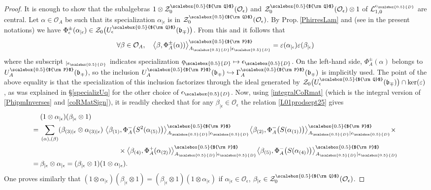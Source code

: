 \documentclass[11pt]{amsart}
\newcommand{\e}{\epsilon}
\newcommand{\Ll}{\mathcal{L}}
\newcommand{\Oo}{\mathcal{O}}
\newcommand{\qD}{q_{\scalebox{0.5}{D}}}
\newcommand{\eD}{\epsilon_{\scalebox{0.5}{D}}}
\newcommand{\Q}{{\scalebox{0.5}{${\rm Q}$}}}
\newcommand{\D}{{\scalebox{0.5}{D}}}
\newcommand{\Pup}{{\scalebox{0.5}{${\rm P}$}}}
\begin{document}
\begin{proof}
It is enough to show that the subalgebras $1\otimes \mathcal{Z}_0^\Q(\Oo_{\e})$ and $\mathcal{Z}_0^\Q(\Oo_{\e})\otimes 1$ of $\Ll_{1,0}^{\eD}$ are central. Let $\alpha\in \Oo_A$ be such that its specialization $\alpha_{\vert \e}$ is in $\mathcal{Z}_0^\Q(\Oo_{\e})$. By Prop.\,\ref{PhirresLam} and \cite[Prop. 6.5]{DC-L} (see \cite[Th.\,2.29(2)]{BR2} in the present notations) we have $\Phi_\e^\pm(\alpha_{\vert \e})\in \mathcal{Z}_0\bigl( U_{\e}^\Q(\mathfrak{b}_\mp) \bigr)$. From this and \cite[Lem.\,2.28]{BR2} it follows that
\[ \forall \beta\in \Oo_A,\quad \bigl\langle \beta,\Phi^\pm_A(\alpha))\bigr\rangle_{A_\D\vert \eD}^\Pup = \varepsilon(\alpha_{\vert \e})\varepsilon(\beta_{\vert \e}) \]
where the subscript $_{\vert\eD}$ indicates specialization $\qD \mapsto \eD$. On the left-hand side, $\Phi^{\pm}_A(\alpha)$ belongs to $U_A^\Pup(\mathfrak{b}_\mp)$, so the inclusion $U_A^\Pup(\mathfrak{b}_\mp) \hookrightarrow \Gamma_A^\Pup(\mathfrak{b}_\mp)$ is implicitly used. The point of the above equality is that the specialization of this inclusion factorizes through the ideal generated by $\mathcal{Z}_0\bigl( U_{\e}^\Q(\mathfrak{b}_\mp) \bigr) \cap \ker(\varepsilon)$, as was explained in \S\ref{specializUq} for the other choice of $\eD$. Now, using \eqref{integralCoRmat} (which is the integral version of \eqref{PhipmInverses} and \eqref{coRMatSign}), it is readily checked that for any $\beta_{\vert \e}\in \Oo_\e$ the relation \eqref{L01prodsept25} gives
\begin{align*}
&(1\otimes \alpha_{\vert \e}) (\beta_{\vert \e}\otimes 1) \\
=\:& \sum_{(\alpha),(\beta)} (\beta_{(3)|\e} \otimes \alpha_{(3)|\e})\ \bigl\langle \beta_{(1)},\Phi_A^-\bigl( S^{2}(\alpha_{(5)})\bigr)\bigr\rangle_{A_\D\vert \eD}^\Pup \bigl\langle \beta_{(2)}, \Phi_A^-\bigl( S(\alpha_{(1)}) \bigr) \bigr\rangle_{A_\D\vert \eD}^\Pup\times \\
& \hspace*{4cm} \times \bigl\langle \beta_{(4)}, \Phi_A^+(\alpha_{(2)}) \bigr\rangle_{A_\D\vert \eD}^\Pup \bigl\langle \beta_{(5)}, \Phi_A^-\bigl( S(\alpha_{(4)}) \bigr)\bigr\rangle_{A_\D\vert \eD}^\Pup \notag \\
=\:& \beta_{\vert \e}\otimes \alpha_{\vert \e}  = (\beta_{\vert \e}\otimes 1)(1\otimes \alpha_{\vert \e}).
\end{align*}
One proves similarly that $(1\otimes \alpha_{\vert \e})(\beta_{\vert \e}\otimes 1) = (\beta_{\vert \e}\otimes 1)(1\otimes \alpha_{\vert \e})$ if $\alpha_{\vert \e}\in \Oo_\e$, $\beta_{\vert \e}\in \mathcal{Z}_0^\Q(\Oo_{\e})$.
\end{proof}
\end{document}
